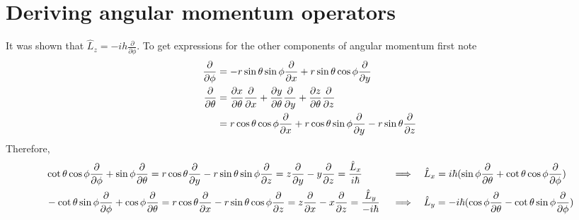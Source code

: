 \documentclass{article}
\begin{document}
\section{Deriving angular momentum operators}
It was shown that $\hat{L}_z = -ih\frac{\partial }{\partial \phi}$. To get expressions for the other components of angular momentum first note 
\begin{align*}
\frac{\partial}{\partial \phi} &= -r \sin\theta \sin\phi \frac{\partial}{\partial x} + r \sin\theta \cos\phi \frac{\partial}{\partial y} \\
\frac{\partial}{\partial \theta} &= \frac{\partial x}{\partial \theta}\frac{\partial}{\partial x} + \frac{\partial y}{\partial \theta}\frac{\partial}{\partial y} + \frac{\partial z}{\partial \theta}\frac{\partial}{\partial z} \\
&= r\cos\theta\cos\phi\frac{\partial}{\partial x} + r\cos\theta\sin\phi\frac{\partial}{\partial y} - r\sin\theta\frac{\partial}{\partial z} 
\end{align*}
Therefore, 
\begin{align*}
\begin{aligned}
& \cot\theta \cos\phi \frac{\partial}{\partial \phi} + \sin\phi \frac{\partial}{\partial \theta} = r\cos\theta \frac{\partial}{\partial y} - r\sin\theta\sin\phi \frac{\partial}{\partial z} = z\frac{\partial}{\partial y} - y\frac{\partial}{\partial z} = \frac{\hat{L}_x}{i \hbar} && \implies && \hat{L}_x  = i \hbar(\sin\phi \frac{\partial}{\partial \theta} + \cot\theta \cos\phi \frac{\partial}{\partial \phi}) \\
& -\cot\theta \sin\phi \frac{\partial}{\partial \phi} + \cos\phi \frac{\partial}{\partial \theta} = r\cos\theta \frac{\partial}{\partial x} - r\sin\theta\cos\phi \frac{\partial}{\partial z} = z\frac{\partial}{\partial x} - x\frac{\partial}{\partial z} = \frac{\hat{L}_y}{-i \hbar} && \implies && \hat{L}_y  = -i \hbar(\cos\phi \frac{\partial}{\partial \theta} - \cot\theta \sin\phi \frac{\partial}{\partial \phi})
\end{aligned}
\end{align*}
\end{document}
